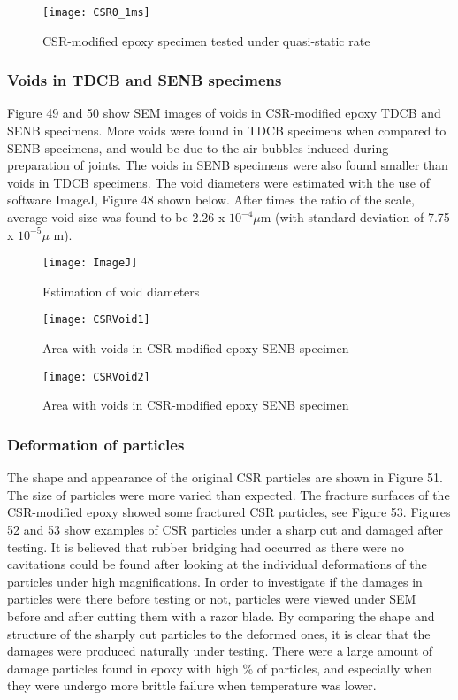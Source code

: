 \documentclass[numbers=noendperiod,chapterprefix=on]{icldt} %
\begin{document}
\begin{figure}[!htpb]
\centering
\texttt{[image: CSR0\_1ms]}
\caption{CSR-modified epoxy specimen tested under quasi-static rate }
\end{figure}

\subsubsection{Voids in TDCB and SENB specimens}
Figure 49 and 50 show SEM images of voids in CSR-modified epoxy TDCB and SENB specimens. More voids were found in TDCB specimens when compared to SENB specimens, and would be due to the air bubbles induced during preparation of joints. The voids in SENB specimens were also found smaller than voids in TDCB specimens. 
The void diameters were estimated with the use of software ImageJ, Figure 48 shown below. After times the ratio of the scale, average void size was found to be 2.26 x $10^{-4}\mu$m (with standard deviation of 7.75 x $10^{-5}\mu$ m).

\begin{figure}[!htpb]
\centering
\texttt{[image: ImageJ]}
\caption{Estimation of void diameters}
\end{figure}

\begin{figure}[!htpb]
\centering
\texttt{[image: CSRVoid1]}
\caption{Area with voids in CSR-modified epoxy SENB specimen}
\end{figure}

\begin{figure}[!htpb]
\centering
\texttt{[image: CSRVoid2]}
\caption{Area with voids in CSR-modified epoxy SENB specimen}
\end{figure}

\subsubsection{Deformation of particles}
The shape and appearance of the original CSR particles are shown in Figure 51. The size of particles were more varied than expected. The fracture surfaces of the CSR-modified epoxy showed some fractured CSR particles, see Figure 53. Figures 52 and 53 show examples of CSR particles under a sharp cut and damaged after testing. It is believed that rubber bridging had occurred as there were no cavitations could be found after looking at the individual deformations of the particles under high magnifications. In order to investigate if the damages in particles were there before testing or not, particles were viewed under SEM before and after cutting them with a razor blade. By comparing the shape and structure of the sharply cut particles to the deformed ones, it is clear that the damages were produced naturally under testing. There were a large amount of damage particles found in epoxy with high \% of particles, and especially when they were undergo more brittle failure when temperature was lower.
\end{document}
